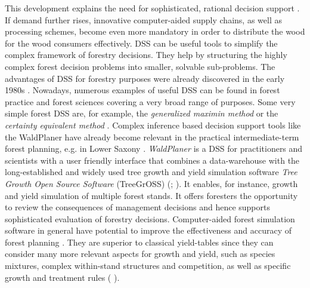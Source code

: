 This development explains the need for sophisticated, rational decision support \citep[p. 2]{hansen_2014}. If demand further rises, innovative computer-aided supply chains, as well as processing schemes, become even more mandatory in order to distribute the wood for the wood consumers effectively. DSS can be useful tools to simplify the complex framework of forestry decisions. They help by structuring the highly complex forest decision problems into smaller, solvable sub-problems. The advantages of DSS for forestry purposes were already discovered in the early 1980s \citep[p. 499]{reynolds_2008}. Nowadays, numerous examples of useful DSS can be found in forest practice and forest sciences covering a very broad range of purposes. Some very simple forest DSS are, for example, the \textit{generalized maximin method} or the \textit{certainty equivalent method} \citep[p. 25, 28]{kangas_2015}. Complex inference based decision support tools like the WaldPlaner \citep{hansen_2014} have already become relevant in the practical intermediate-term forest planning, e.g. in Lower Saxony \citep[p. 158]{bockmann_2004}. \textit{WaldPlaner} is a DSS for practitioners and scientists with a user friendly interface that combines a data-warehouse with the long-established and widely used tree growth and yield simulation software \textit{Tree Growth Open Source Software} (TreeGrOSS) (\citealp[p. 46]{hansen_2014}; \citealp{nagel_2009}). It enables, for instance, growth and yield simulation of multiple forest stands. It offers foresters the opportunity to review the consequences of management decisions and hence supports sophisticated evaluation of forestry decisions. Computer-aided forest simulation software in general have potential to improve the effectiveness and accuracy of forest planning \citep[p. 210]{davis_2001}. They are superior to classical yield-tables since they can consider many more relevant aspects for growth and yield, such as species mixtures, complex within-stand structures and competition, as well as specific growth and treatment rules (\citealp[p. 3]{hansen_2012} \citealp[p. 93]{muys_2010}).

